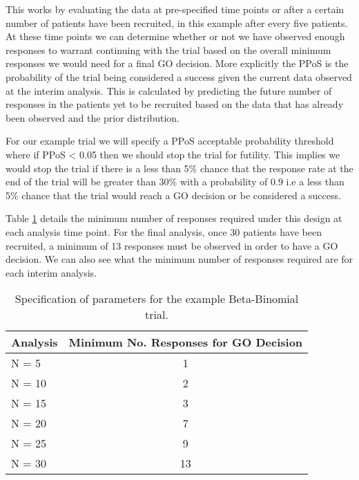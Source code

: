 This works by evaluating the data at pre-specified time points or after a certain number of patients have been recruited, in this example after every five patients. At these time points we can determine whether or not we have observed enough responses to warrant continuing with the trial based on the overall minimum responses we would need for a final GO decision. More explicitly the PPoS is the probability of the trial being considered a success given the current data observed at the interim analysis. This is calculated by predicting the future number of responses in the patients yet to be recruited based on the data that has already been observed and the prior distribution.

For our example trial we will specify a PPoS acceptable probability threshold where if PPoS < 0.05 then we should stop the trial for futility. This implies we would stop the trial if there is a less than 5\% chance that the response rate at the end of the trial will be greater than 30\% with a probability of 0.9 i.e a less than 5\% chance that the trial would reach a GO decision or be considered a success. 

Table \ref{tab_etp:exampleBBspecs} details the minimum number of responses required under this design at each analysis time point. For the final analysis, once 30 patients have been recruited, a minimum of 13 responses must be observed in order to have a GO decision. We can also see what the minimum number of responses required are for each interim analysis.

\begin{table}[h!]
	\centering
	\caption{Specification of parameters for the example Beta-Binomial trial.}
	\label{tab_etp:exampleBBspecs}
	\begin{tabular}{l|c}
		\hline
		\textbf{Analysis}     & \textbf{Minimum No. Responses for GO Decision}               \\ \hline
		N = 5  & 1                            \\
		N = 10 & 2                            \\
		N = 15 & 3                           \\
		N = 20 & 7                            \\
		N = 25 & 9                         \\
		N = 30 & 13                  \\ \hline
	\end{tabular}
\end{table}

